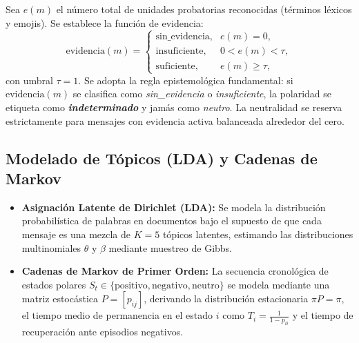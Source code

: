 Sea $e(m)$ el número total de unidades probatorias reconocidas (términos léxicos y emojis). Se establece la función de evidencia:
\begin{equation}
\text{evidencia}(m) =
\begin{cases}
  \text{sin\_evidencia}, & e(m) = 0,\\
  \text{insuficiente},   & 0 < e(m) < \tau,\\
  \text{suficiente},     & e(m) \ge \tau,
\end{cases}
\end{equation}
con umbral $\tau = 1$. Se adopta la regla epistemológica fundamental: si $\text{evidencia}(m)$ se clasifica como \emph{sin\_evidencia} o \emph{insuficiente}, la polaridad se etiqueta como \textbf{\emph{indeterminado}} y jamás como \emph{neutro}. La neutralidad se reserva estrictamente para mensajes con evidencia activa balanceada alrededor del cero.

\subsection{Modelado de Tópicos (LDA) y Cadenas de Markov}

\begin{itemize}
  \item \textbf{Asignación Latente de Dirichlet (LDA):} Se modela la distribución probabilística de palabras en documentos bajo el supuesto de que cada mensaje es una mezcla de $K=5$ tópicos latentes, estimando las distribuciones multinomiales $\theta$ y $\beta$ mediante muestreo de Gibbs.
  \item \textbf{Cadenas de Markov de Primer Orden:} La secuencia cronológica de estados polares $S_t \in \{\text{positivo}, \text{negativo}, \text{neutro}\}$ se modela mediante una matriz estocástica $P = [p_{ij}]$, derivando la distribución estacionaria $\pi P = \pi$, el tiempo medio de permanencia en el estado $i$ como $T_i = \frac{1}{1 - p_{ii}}$ y el tiempo de recuperación ante episodios negativos.
\end{itemize}